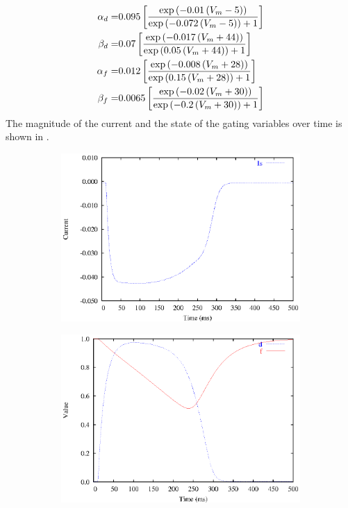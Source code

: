 \begin{align}
  \alpha_{d} =& 0.095\left[ \dfrac{\exp\left( -0.01\left( V_m-5 \right) \right)}
    {\exp\left( -0.072\left( V_m-5 \right) \right)+1} \right] \\
  \beta_{d} =& 0.07\left[ \dfrac{\exp\left( -0.017\left( V_m+44 \right) \right)}
    {\exp\left( 0.05\left( V_m+44 \right) \right)+1} \right] \\
  \alpha_{f} =& 0.012\left[ \dfrac{\exp\left( -0.008\left( V_m+28 \right) \right)}
    {\exp\left( 0.15\left( V_m+28 \right) \right)+1} \right] \\
  \beta_{f} =& 0.0065\left[ \dfrac{\exp\left( -0.02\left( V_m+30 \right) \right)}
    {\exp\left( -0.2\left( V_m+30 \right) \right)+1} \right]
\end{align}
The magnitude of the current and the state of the gating variables over time
is shown in .
\begin{figure}[hbtp] 
  \centering
  \begin{subfigure}[b]{0.45\linewidth}
    \centering
    \includegraphics[width=\textwidth]{cardiac_electrophysiology/epsfiles/BR_Is.eps}
    \caption{}
  \end{subfigure}
  \hfill
  \begin{subfigure}[b]{0.45\linewidth}
    \centering
    \includegraphics[width=\textwidth]{cardiac_electrophysiology/epsfiles/BR_df.eps}

\end{subfigure}
\end{figure}
